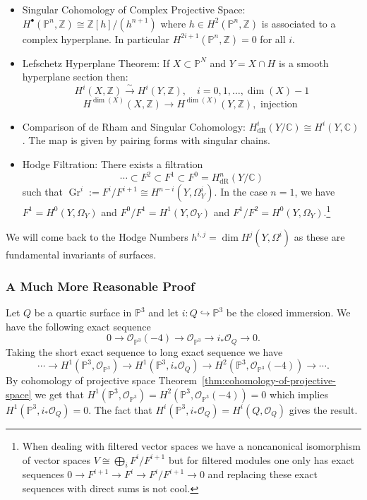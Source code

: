 \documentclass[12pt]{article}
\numberwithin{equation}{section}
\theoremstyle{definition}
\theoremstyle{remark}
\newcommand{\CC}{\mathbb{C}}
\newcommand{\ZZ}{\mathbb{Z}}
\newcommand{\Ocal}{\mathcal{O}}
\newcommand{\PP}{\mathbb{P}}
\newcommand{\dR}{\operatorname{dR}}
\newcommand{\Gr}{\operatorname{Gr}}
\begin{document}
\begin{itemize}
	\item Singular Cohomology of Complex Projective Space: $H^{\bullet}(\PP^n,\ZZ) \cong \ZZ[h]/(h^{n+1})$ where $h\in H^2(\PP^n,\ZZ)$ is associated to a complex hyperplane. 
	In particular $H^{2i+1}(\PP^n,\ZZ)=0$ for all $i$. 
	\item Lefschetz Hyperplane Theorem: If $X \subset \PP^N$ and $Y = X \cap H$ is a smooth hyperplane section then:
	$$ H^i(X,\ZZ) \xrightarrow{\sim} H^i(Y,\ZZ), \quad i=0,1,\ldots,\dim(X)-1 $$
	$$ H^{\dim(X)}(X,\ZZ) \to H^{\dim(X)}(Y,\ZZ), \mbox{ injection } $$
	\item Comparison of de Rham and Singular Cohomology: $H^i_{\dR}(Y/\CC) \cong H^i(Y,\CC)$. 
	The map is given by pairing forms with singular chains. 
	\item Hodge Filtration: There exists a filtration 
	$$\cdots \subset F^2 \subset F^1 \subset F^0 =H^n_{\dR}(Y/\CC)$$ 
	such that $\Gr^{i}:=F^i/F^{i+1} \cong H^{n-i}(Y,\Omega_Y^i)$.
	In the case $n=1$, we have $F^1 = H^0(Y,\Omega_Y)$ and $F^0/F^1 = H^1(Y,\Ocal_Y)$ and $F^1/F^2=H^0(Y,\Omega_Y)$.\footnote{
	When dealing with filtered vector spaces we have a noncanonical isomorphism of vector spaces $V \cong \bigoplus_i F^i/F^{i+1}$ but for filtered modules one only has exact sequences $0\to F^{i+1} \to F^i \to F^i/F^{i+1} \to 0$ and replacing these exact sequences with direct sums is not cool. }
\end{itemize}

We will come back to the Hodge Numbers $h^{i,j} = \dim H^j(Y,\Omega^i)$ as these are fundamental invariants of surfaces. 

\subsubsection{A Much More Reasonable Proof}
Let $Q$ be a quartic surface in $\PP^3$ and let $i:Q\hookrightarrow \PP^3$ be the closed immersion. 
We have the following exact sequence 
 $$ 0 \to \Ocal_{\PP^3}(-4) \to \Ocal_{\PP^3} \to i_*\Ocal_Q \to 0. $$
Taking the short exact sequence to long exact sequence we have 
 $$ \cdots \to H^1(\PP^3,\Ocal_{\PP^3}) \to H^1(\PP^3,i_*\Ocal_Q) \to H^2(\PP^3,\Ocal_{\PP^3}(-4) ) \to \cdots.$$
By cohomology of projective space Theorem~\ref{thm:cohomology-of-projective-space} we get that $H^1(\PP^3,\Ocal_{\PP^3})=H^2(\PP^3,\Ocal_{\PP^3}(-4) )=0$ which implies $H^1(\PP^3,i_*\Ocal_Q)=0$. 
The fact that $H^i(\PP^3,i_*\Ocal_Q) = H^i(Q,\Ocal_Q)$ gives the result.
\end{document}
